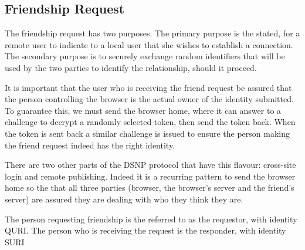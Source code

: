\documentclass[letterpaper,11pt,oneside]{article}
\begin{document}
\subsection{Friendship Request}

The friendship request has two purposes. The primary purpose is the stated, for
a remote user to indicate to a local user that she wishes to establish a
connection. The secondary purpose is to securely exchange random identifiers
that will be used by the two parties to identify the relationship, should it
proceed.

It is important that the user who is receiving the friend request be assured
that the person controlling the browser is the actual owner of the identity
submitted. To guarantee this, we must send the browser home, where it can
answer to a challenge to decrypt a randomly selected token, then send the token
back. When the token is sent back a similar challenge is issued to ensure the
person making the friend request indeed has the right identity.

There are two other parts of the DSNP protocol that have this flavour:
cross-site login and remote publishing. Indeed it is a recurring pattern to
send the browser home so the that all three parties (browser, the browser's
server and the friend's server) are assured they are dealing with who they
think they are.

The person requesting friendship is the referred to as the requestor, with
identity QURI. The person who is receiving the request is the responder, with
identity SURI
\end{document}
